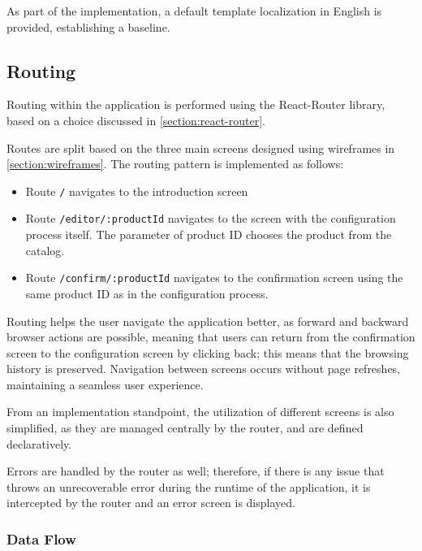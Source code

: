 As part of the implementation, a default template localization in English is provided, establishing a baseline.


\subsection{Routing}

Routing within the application is performed using the React-Router library, based on a choice discussed in \autoref{section:react-router}.

Routes are split based on the three main screens designed using wireframes in \autoref{section:wireframes}. The routing pattern is implemented as follows:

\begin{itemize}[label=\rectanglebullet]
    \item Route \texttt{/} navigates to the introduction screen
    \item Route \texttt{/editor/:productId} navigates to the screen with the configuration process itself. The parameter of product ID chooses the product from the catalog.
    \item Route \texttt{/confirm/:productId} navigates to the confirmation screen using the same product ID as in the configuration process.
\end{itemize}

Routing helps the user navigate the application better, as forward and backward browser actions are possible, meaning that users can return from the confirmation screen to the configuration screen by clicking back; this means that the browsing history is preserved. Navigation between screens occurs without page refreshes, maintaining a seamless user experience.

From an implementation standpoint, the utilization of different screens is also simplified, as they are managed centrally by the router, and are defined declaratively. 

Errors are handled by the router as well; therefore, if there is any issue that throws an unrecoverable error during the runtime of the application, it is intercepted by the router and an error screen is displayed.


\subsubsection{Data Flow}

